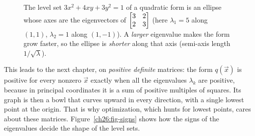 \begin{figure}[H]
\centering
{}
\caption{The level set $3x^2+4xy+3y^2=1$ of a quadratic form is an ellipse whose
axes are the eigenvectors of $\protect\begin{bmatrix}3&2\\2&3\protect\end{bmatrix}$
(here $\lambda_1=5$ along $(1,1)$, $\lambda_2=1$ along $(1,-1)$). A \emph{larger}
eigenvalue makes the form grow faster, so the ellipse is \emph{shorter} along that
axis (semi-axis length $1/\sqrt{\lambda}$).}
\label{ch26:fig-quadform}
\end{figure}

This leads to the next chapter, on \emph{positive definite} matrices: the
form $q(\vec{x})$ is positive for every nonzero $\vec{x}$ exactly when all the
eigenvalues $\lambda_k$ are positive, because in principal coordinates it is a
sum of positive multiples of squares. Its graph is then a bowl that curves upward
in every direction, with a single lowest point at the origin. That is why
optimization, which hunts for lowest points, cares about these matrices.
Figure~\ref{ch26:fig-signs} shows how the signs of the eigenvalues decide the
shape of the level sets.

